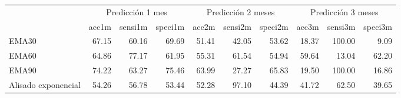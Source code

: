 \documentclass[]{article}
\newenvironment{Shaded}{\begin{snugshade}}{\end{snugshade}}
\newcommand{\KeywordTok}[1]{\textcolor[rgb]{0.13,0.29,0.53}{\textbf{#1}}}
\newcommand{\DataTypeTok}[1]{\textcolor[rgb]{0.13,0.29,0.53}{#1}}
\newcommand{\DecValTok}[1]{\textcolor[rgb]{0.00,0.00,0.81}{#1}}
\newcommand{\StringTok}[1]{\textcolor[rgb]{0.31,0.60,0.02}{#1}}
\newcommand{\OperatorTok}[1]{\textcolor[rgb]{0.81,0.36,0.00}{\textbf{#1}}}
\newcommand{\NormalTok}[1]{#1}
\begin{document}
\begin{Shaded}
\end{Shaded}

\begin{table}[H]
\centering\begingroup\fontsize{10}{12}\selectfont

\begin{tabular}{l|r|r|r|r|r|r|r|r|r}
\hline
\multicolumn{1}{c|}{ } & \multicolumn{3}{|c|}{Predicción 1 mes} & \multicolumn{3}{|c|}{Predicción 2 meses} & \multicolumn{3}{|c}{Predicción 3 meses} \\
\cline{2-4} \cline{5-7} \cline{8-10}
  & acc1m & sensi1m & speci1m & acc2m & sensi2m & speci2m & acc3m & sensi3m & speci3m\\
\hline
EMA30 & 67.15 & 60.16 & 69.69 & 51.41 & 42.05 & 53.62 & 18.37 & 100.00 & 9.09\\
\hline
EMA60 & 64.86 & 77.17 & 61.95 & 55.31 & 61.54 & 54.94 & 59.64 & 13.04 & 62.20\\
\hline
EMA90 & 74.22 & 63.27 & 75.46 & 63.99 & 27.27 & 65.83 & 19.50 & 100.00 & 16.86\\
\hline
Alisado exponencial & 54.26 & 56.78 & 53.44 & 52.28 & 97.10 & 44.39 & 41.72 & 62.50 & 39.65\\
\hline
\end{tabular}\endgroup{}
\end{table}
\end{document}
